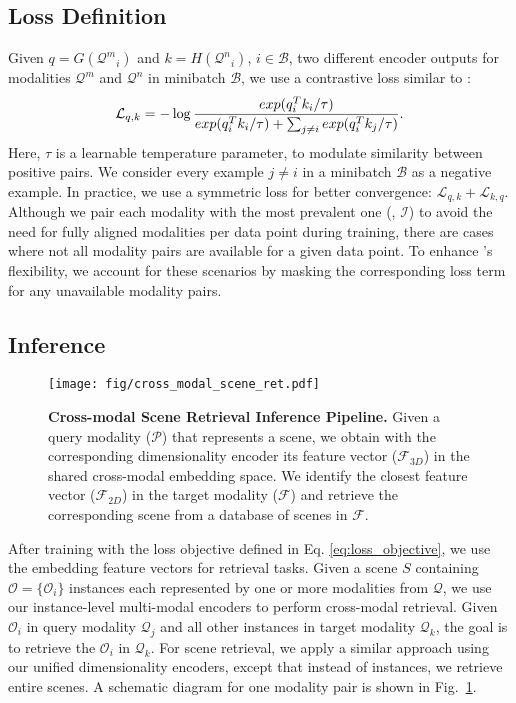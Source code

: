 \subsection{Loss Definition} Given $q = G({\mathcal{Q}^m}_{i})$ and $k = H({\mathcal{Q}^n}_i)$, $i \in \mathcal{B}$, two different encoder outputs for modalities $\mathcal{Q}^m$ and $\mathcal{Q}^n$ in minibatch $\mathcal{B}$, we use a contrastive loss similar to \cite{girdhar2023imagebind}:
\begin{equation}
    \vspace{-4pt}
    \mathcal{L}_{q, k} = - \log \frac{exp(q_i^Tk_i / \tau)}{exp(q_i^Tk_i / \tau) +  \sum_{j \neq i}{exp(q_i^Tk_j / \tau)}}.
\end{equation}
Here, $\tau$ is a learnable temperature parameter, to modulate similarity between positive pairs. We consider every example $j \neq i$ in a minibatch $\mathcal{B}$ as a negative example. In practice, we use a symmetric loss for better convergence: $\mathcal{L}_{q, k} + \mathcal{L}_{k, q}$. Although we pair each modality with the most prevalent one (\ie, $\mathcal{I}$) to avoid the need for fully aligned modalities per data point during training, there are cases where not all modality pairs are available for a given data point. To enhance \project{}'s flexibility, we account for these scenarios by masking the corresponding loss term for any unavailable modality pairs. 

\subsection{Inference}
\begin{figure}
    \centering
    \texttt{[image: fig/cross\_modal\_scene\_ret.pdf]}
    \caption{\textbf{Cross-modal Scene Retrieval Inference Pipeline.} Given a query modality ($\mathcal{P}$) that represents a scene, we obtain with the corresponding dimensionality encoder its feature vector ($\mathcal{F}_{3D}$) in the shared cross-modal embedding space. We identify the closest feature vector ($\mathcal{F}_{2D}$) in the target modality ($\mathcal{F}$) and retrieve the corresponding scene from a database of scenes in $\mathcal{F}$.}  
    \label{fig:cross_modal_retrieval_schema}
\end{figure} 
\vspace{-1mm}

After training \project{} with the loss objective defined in Eq. \ref{eq:loss_objective}, we use the embedding feature vectors for retrieval tasks. Given a scene $S$ containing $\mathcal{O} = \{ \mathcal{O}_i \}$ instances each represented by one or more modalities from $\mathcal{Q}$, we use our instance-level multi-modal encoders to perform cross-modal retrieval. Given $\mathcal{O}_i$ in query modality $\mathcal{Q}_j$ and all other instances in target modality $\mathcal{Q}_k$, the goal is to retrieve the $\mathcal{O}_i$ in $\mathcal{Q}_k$. For scene retrieval, we apply a similar approach using our unified dimensionality encoders, except that instead of instances, we retrieve entire scenes. A schematic diagram for one modality pair is shown in Fig.~\ref{fig:cross_modal_retrieval_schema}.

